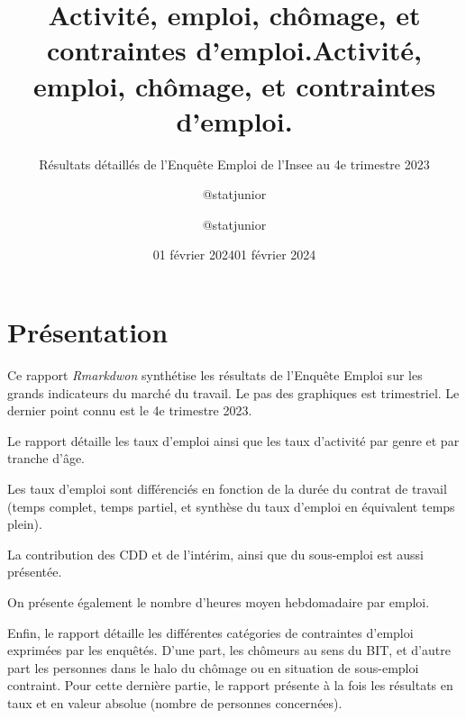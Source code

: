\documentclass[
  paper=a4,
  ,captions=tableheading
]{scrartcl}
\title{Activité, emploi, chômage, et contraintes d'emploi.}
\subtitle{Résultats détaillés de l'Enquête Emploi de l'Insee au 4e
trimestre 2023}
\author{@statjunior}
\date{01 février 2024}
\title{Activité, emploi, chômage, et contraintes d'emploi.}
\author{@statjunior}
\date{01 février 2024}
\begin{document}
\begin{titlepage}
\afterpage{\restorepagecolor}
\newcommand{\colorRule}[3][black]{\textcolor[HTML]{#1}{\rule{#2}{#3}}}
\end{titlepage}
\restoregeometry
{} 




\hypertarget{pruxe9sentation}{%
\section{Présentation}\label{pruxe9sentation}}

Ce rapport \emph{Rmarkdwon} synthétise les résultats de l'Enquête Emploi
sur les grands indicateurs du marché du travail. Le pas des graphiques
est trimestriel. Le dernier point connu est le 4e trimestre 2023.

Le rapport détaille les taux d'emploi ainsi que les taux d'activité par
genre et par tranche d'âge.

Les taux d'emploi sont différenciés en fonction de la durée du contrat
de travail (temps complet, temps partiel, et synthèse du taux d'emploi
en équivalent temps plein).

La contribution des CDD et de l'intérim, ainsi que du sous-emploi est
aussi présentée.

On présente également le nombre d'heures moyen hebdomadaire par emploi.

Enfin, le rapport détaille les différentes catégories de contraintes
d'emploi exprimées par les enquêtés. D'une part, les chômeurs au sens du
BIT, et d'autre part les personnes dans le halo du chômage ou en
situation de sous-emploi contraint. Pour cette dernière partie, le
rapport présente à la fois les résultats en taux et en valeur absolue
(nombre de personnes concernées).
\end{document}
